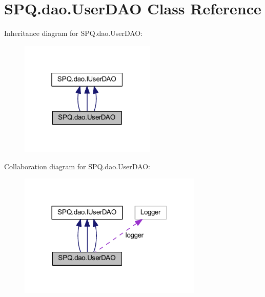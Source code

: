 \hypertarget{class_s_p_q_1_1dao_1_1_user_d_a_o}{}\section{S\+P\+Q.\+dao.\+User\+D\+AO Class Reference}
\label{class_s_p_q_1_1dao_1_1_user_d_a_o}


Inheritance diagram for S\+P\+Q.\+dao.\+User\+D\+AO\+:\nopagebreak
\begin{figure}[H]
\begin{center}
\leavevmode
\includegraphics[width=183pt]{class_s_p_q_1_1dao_1_1_user_d_a_o__inherit__graph}
\end{center}
\end{figure}


Collaboration diagram for S\+P\+Q.\+dao.\+User\+D\+AO\+:\nopagebreak
\begin{figure}[H]
\begin{center}
\leavevmode
\includegraphics[width=248pt]{class_s_p_q_1_1dao_1_1_user_d_a_o__coll__graph}
\end{center}
\end{figure}
